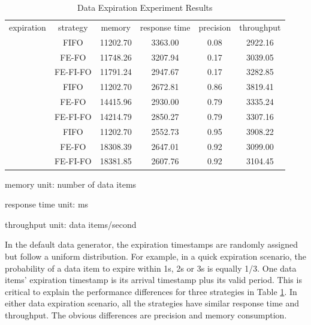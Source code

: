 \begin{table}[!htbp]
\centering
\caption{Data Expiration Experiment Results}
\label{tab:6-dei}
\begin{tabular}{|c||c||c|c|c|c|}
\hline
expiration & strategy & memory & response time & precision & throughput \\ \hhline{|=#=#=|=|=|=|}
\multirow{3}{*}{quick} & FIFO & 11202.70 & 3363.00 & 0.08 & 2922.16 \\ \cline{2-6} 
 					  & FE-FO & 11748.26 & 3207.94 & 0.17 & 3039.05 \\ \cline{2-6} 
 					  & FE-FI-FO & 11791.24 & 2947.67 & 0.17 & 3282.85 \\ \hhline{|=#=#=|=|=|=|}
\multirow{3}{*}{normal} & FIFO & 11202.70 & 2672.81 & 0.86 & 3819.41 \\ \cline{2-6} 
 						& FE-FO & 14415.96 & 2930.00 & 0.79 & 3335.24 \\ \cline{2-6} 
 						& FE-FI-FO & 14214.79 & 2850.27 & 0.79 & 3307.16 \\ \hhline{|=#=#=|=|=|=|}
\multirow{3}{*}{slow} & FIFO & 11202.70 & 2552.73 & 0.95 & 3908.22\\ \cline{2-6} 
					  & FE-FO & 18308.39 & 2647.01 & 0.92 & 3099.00 \\ \cline{2-6} 
 					  & FE-FI-FO & 18381.85 & 2607.76 & 0.92 & 3104.45 \\ \hline
\end{tabular}
	\begin{tablenotes}
 		\item memory unit: number of data items
 		\item response time unit: ms
 		\item throughput unit: data items/second
    \end{tablenotes}
\end{table}

In the default data generator, the expiration timestamps are randomly assigned but follow a uniform distribution.
For example, in a quick expiration scenario, the probability of a data item to expire within 1s, 2s or 3s is equally 1/3.
One data items' expiration timestamp is its arrival timestamp plus its valid period.
This is critical to explain the performance differences for three strategies in Table \ref{tab:6-dei}.
In either data expiration scenario, all the strategies have similar response time and throughput. 
The obvious differences are precision and memory consumption. 

